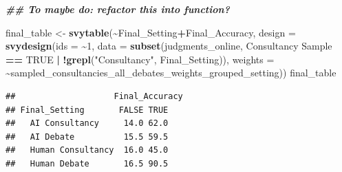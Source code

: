 \documentclass[
]{article}
\newenvironment{Shaded}{\begin{snugshade}}{\end{snugshade}}
\newcommand{\AttributeTok}[1]{\textcolor[rgb]{0.13,0.29,0.53}{#1}}
\newcommand{\ConstantTok}[1]{\textcolor[rgb]{0.56,0.35,0.01}{#1}}
\newcommand{\DecValTok}[1]{\textcolor[rgb]{0.00,0.00,0.81}{#1}}
\newcommand{\DocumentationTok}[1]{\textcolor[rgb]{0.56,0.35,0.01}{\textbf{\textit{#1}}}}
\newcommand{\FunctionTok}[1]{\textcolor[rgb]{0.13,0.29,0.53}{\textbf{#1}}}
\newcommand{\NormalTok}[1]{#1}
\newcommand{\OtherTok}[1]{\textcolor[rgb]{0.56,0.35,0.01}{#1}}
\newcommand{\SpecialCharTok}[1]{\textcolor[rgb]{0.81,0.36,0.00}{\textbf{#1}}}
\newcommand{\StringTok}[1]{\textcolor[rgb]{0.31,0.60,0.02}{#1}}
\begin{document}
\begin{Shaded}
\begin{Highlighting}[]
\DocumentationTok{\#\# To maybe do: refactor this into function?}

\NormalTok{final\_table }\OtherTok{\textless{}{-}} \FunctionTok{svytable}\NormalTok{(}\SpecialCharTok{\textasciitilde{}}\NormalTok{Final\_Setting}\SpecialCharTok{+}\NormalTok{Final\_Accuracy, }
                        \AttributeTok{design =} \FunctionTok{svydesign}\NormalTok{(}\AttributeTok{ids =} \SpecialCharTok{\textasciitilde{}}\DecValTok{1}\NormalTok{, }
                                           \AttributeTok{data =} \FunctionTok{subset}\NormalTok{(judgments\_online, }\StringTok{\textasciigrave{}}\AttributeTok{Consultancy Sample}\StringTok{\textasciigrave{}} \SpecialCharTok{==} \ConstantTok{TRUE} \SpecialCharTok{|} \SpecialCharTok{!}\FunctionTok{grepl}\NormalTok{(}\StringTok{"Consultancy"}\NormalTok{, Final\_Setting)),}
                                           \AttributeTok{weights =} \SpecialCharTok{\textasciitilde{}}\NormalTok{sampled\_consultancies\_all\_debates\_weights\_grouped\_setting))}
\NormalTok{final\_table}
\end{Highlighting}
\end{Shaded}

\begin{verbatim}
##                    Final_Accuracy
## Final_Setting       FALSE TRUE
##   AI Consultancy     14.0 62.0
##   AI Debate          15.5 59.5
##   Human Consultancy  16.0 45.0
##   Human Debate       16.5 90.5
\end{verbatim}
\end{document}
